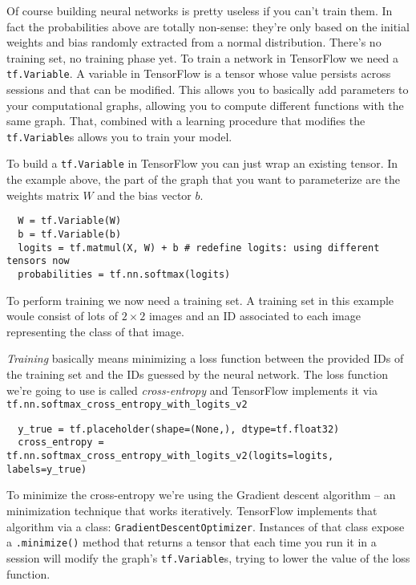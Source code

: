 Of course building neural networks is pretty useless if you can't train
them. In fact the probabilities above are totally non-sense: they're
only based on the initial weights and bias randomly extracted from a
normal distribution. There's no training set, no training phase yet. To
train a network in TensorFlow we need a \texttt{tf.Variable}. A
variable in TensorFlow is a tensor whose value persists across sessions
and that can be modified. This allows you to basically add parameters
to your computational graphs, allowing you to compute different
functions with the same graph. That, combined with a learning procedure
that modifies the \texttt{tf.Variable}s allows you to train your model.

To build a \texttt{tf.Variable} in TensorFlow you can just wrap an
existing tensor. In the example above, the part of the graph that you
want to parameterize are the weights matrix $W$ and the bias vector
$b$.

\begin{verbatim}
  W = tf.Variable(W)
  b = tf.Variable(b)
  logits = tf.matmul(X, W) + b # redefine logits: using different tensors now
  probabilities = tf.nn.softmax(logits)
\end{verbatim}

To perform training we now need a training set. A training set in this
example woule consist of lots of \(2 \times 2\) images and an ID
associated to each image representing the class of that image.

\emph{Training} basically means minimizing a loss function between the
provided IDs of the training set and the IDs guessed by the neural
network. The loss function we're going to use is called
\emph{cross-entropy} and TensorFlow implements it via
\texttt{tf.nn.softmax\_cross\_entropy\_with\_logits\_v2}

\begin{verbatim}
  y_true = tf.placeholder(shape=(None,), dtype=tf.float32)
  cross_entropy = tf.nn.softmax_cross_entropy_with_logits_v2(logits=logits, labels=y_true)
\end{verbatim}

To minimize the cross-entropy we're using the Gradient descent
algorithm -- an minimization technique that works iteratively.
TensorFlow implements that algorithm via a class:
\texttt{GradientDescentOptimizer}. Instances of that class expose
a \texttt{.minimize()} method that returns a tensor that each time you
run it in a session will modify the graph's \texttt{tf.Variable}s,
trying to lower the value of the loss function.

